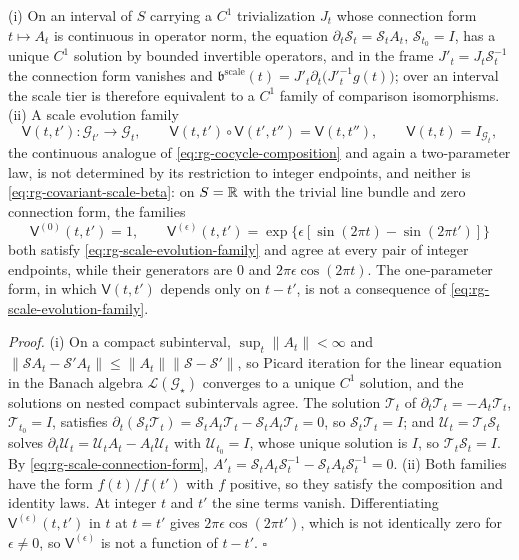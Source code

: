 (i) On an interval of \(S\) carrying a \(C^1\) trivialization \(J_t\) whose
connection form \(t\mapsto A_t\) is continuous in operator norm, the equation
\(\partial_t\mathcal S_t=\mathcal S_tA_t\), \(\mathcal S_{t_0}=I\), has a unique
\(C^1\) solution by bounded invertible operators, and in the frame
\(J'_t=J_t\mathcal S_t^{-1}\) the connection form vanishes and
\(\mathfrak b^{\mathrm{scale}}(t)=J'_t\partial_t\bigl(J'^{-1}_tg(t)\bigr)\); over
an interval the scale tier is therefore equivalent to a \(C^1\) family of
comparison isomorphisms. (ii) A scale evolution family
\begin{equation}
\mathsf V(t,t'):\mathscr G_{t'}\longrightarrow\mathscr G_t,
\qquad
\mathsf V(t,t')\circ\mathsf V(t',t'')=\mathsf V(t,t''),
\qquad
\mathsf V(t,t)=I_{\mathscr G_t},
\label{eq:rg-scale-evolution-family}
\end{equation}
the continuous analogue of \eqref{eq:rg-cocycle-composition} and again a
two-parameter law, is not determined by its restriction to integer endpoints,
and neither is \eqref{eq:rg-covariant-scale-beta}: on \(S=\mathbb R\) with the trivial
line bundle and zero connection form, the families
\begin{equation}
\mathsf V^{(0)}(t,t')=1,
\qquad
\mathsf V^{(\epsilon)}(t,t')
=\exp\bigl\{\epsilon[\sin(2\pi t)-\sin(2\pi t')]\bigr\}
\label{eq:rg-scale-interpolation-witness}
\end{equation}
both satisfy \eqref{eq:rg-scale-evolution-family} and agree at every pair of
integer endpoints, while their generators are \(0\) and
\(2\pi\epsilon\cos(2\pi t)\). The one-parameter form, in which
\(\mathsf V(t,t')\) depends only on \(t-t'\), is not a consequence of
\eqref{eq:rg-scale-evolution-family}. 

\noindent\emph{Proof.}
(i) On a compact subinterval, \(\sup_t\lVert A_t\rVert<\infty\) and
\(\lVert\mathcal SA_t-\mathcal S'A_t\rVert\leq\lVert A_t\rVert
\lVert\mathcal S-\mathcal S'\rVert\), so Picard iteration for the linear equation
in the Banach algebra \(\mathcal L(\mathcal G_\star)\) converges to a unique
\(C^1\) solution, and the solutions on nested compact subintervals agree. The
solution \(\mathcal T_t\) of \(\partial_t\mathcal T_t=-A_t\mathcal T_t\),
\(\mathcal T_{t_0}=I\), satisfies
\(\partial_t(\mathcal S_t\mathcal T_t)=\mathcal S_tA_t\mathcal T_t
-\mathcal S_tA_t\mathcal T_t=0\), so \(\mathcal S_t\mathcal T_t=I\); and
\(\mathcal U_t=\mathcal T_t\mathcal S_t\) solves
\(\partial_t\mathcal U_t=\mathcal U_tA_t-A_t\mathcal U_t\) with
\(\mathcal U_{t_0}=I\), whose unique solution is \(I\), so
\(\mathcal T_t\mathcal S_t=I\). By \eqref{eq:rg-scale-connection-form},
\(A'_t=\mathcal S_tA_t\mathcal S_t^{-1}-\mathcal S_tA_t\mathcal S_t^{-1}=0\).
(ii) Both families have the form \(f(t)/f(t')\) with \(f\) positive, so they
satisfy the composition and identity laws. At integer \(t\) and \(t'\) the sine
terms vanish. Differentiating \(\mathsf V^{(\epsilon)}(t,t')\) in \(t\) at
\(t=t'\) gives \(2\pi\epsilon\cos(2\pi t')\), which is not identically zero for
\(\epsilon\neq0\), so \(\mathsf V^{(\epsilon)}\) is not a function of \(t-t'\).
\(\square\)


